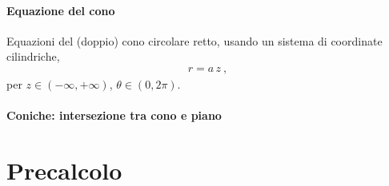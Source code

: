 \documentclass[letterpaper,10pt,italian]{jupyterBook}
\begin{document}
\subsection{Equazione del cono}
\label{\detokenize{ch/analytic_geometry/analytic_geometry_3d/cone:equazione-del-cono}}
\sphinxAtStartPar
Equazioni del (doppio) cono circolare retto, usando un sistema di coordinate cilindriche,
\begin{equation*}
\begin{split}r = a \, z \ ,\end{split}
\end{equation*}
\sphinxAtStartPar
per \(z \in (-\infty, +\infty)\), \(\theta \in (0, 2 \pi)\).


\subsection{Coniche: intersezione tra cono e piano}
\label{\detokenize{ch/analytic_geometry/analytic_geometry_3d/cone:coniche-intersezione-tra-cono-e-piano}}\label{\detokenize{ch/analytic_geometry/analytic_geometry_3d/cone:geometry-analytic-3d-cone-conics}}
\sphinxstepscope


\part{Precalcolo}

\sphinxstepscope
\end{document}
